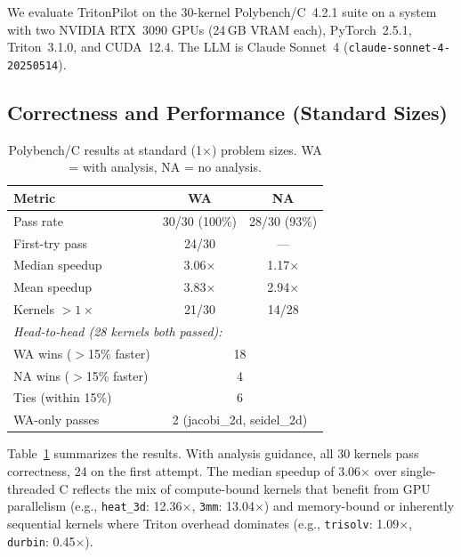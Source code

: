 \documentclass[sigconf]{acmart}
\newcommand{\sysname}{TritonPilot\xspace}
\begin{document}
We evaluate \sysname on the 30-kernel Polybench/C~4.2.1 suite on a
system with two NVIDIA RTX~3090 GPUs (24\,GB VRAM each), PyTorch~2.5.1,
Triton~3.1.0, and CUDA~12.4.  The LLM is Claude Sonnet~4
(\texttt{claude-sonnet-4-20250514}).

\subsection{Correctness and Performance (Standard Sizes)}

\begin{table}[t]
  \caption{Polybench/C results at standard (1$\times$) problem sizes.
    WA = with analysis, NA = no analysis.}
  \label{tab:results_1x}
  \centering\small
  \begin{tabular}{lcc}
    \toprule
    \textbf{Metric} & \textbf{WA} & \textbf{NA} \\
    \midrule
    Pass rate              & 30/30 (100\%) & 28/30 (93\%) \\
    First-try pass         & 24/30         & ---           \\
    Median speedup         & 3.06$\times$  & 1.17$\times$ \\
    Mean speedup           & 3.83$\times$  & 2.94$\times$ \\
    Kernels $>1\times$     & 21/30         & 14/28         \\
    \midrule
    \multicolumn{3}{l}{\emph{Head-to-head (28 kernels both passed):}} \\
    WA wins ($>$15\% faster) & \multicolumn{2}{c}{18} \\
    NA wins ($>$15\% faster) & \multicolumn{2}{c}{4}  \\
    Ties (within 15\%)       & \multicolumn{2}{c}{6}  \\
    WA-only passes           & \multicolumn{2}{c}{2 (jacobi\_2d, seidel\_2d)}  \\
    \bottomrule
  \end{tabular}
\end{table}

Table~\ref{tab:results_1x} summarizes the results.  With analysis
guidance, all 30 kernels pass correctness, 24 on the first attempt.
The median speedup of 3.06$\times$ over single-threaded C reflects the
mix of compute-bound kernels that benefit from GPU parallelism (e.g.,
\texttt{heat\_3d}: 12.36$\times$, \texttt{3mm}: 13.04$\times$) and
memory-bound or inherently sequential kernels where Triton overhead
dominates (e.g., \texttt{trisolv}: 1.09$\times$, \texttt{durbin}:
0.45$\times$).
\end{document}

